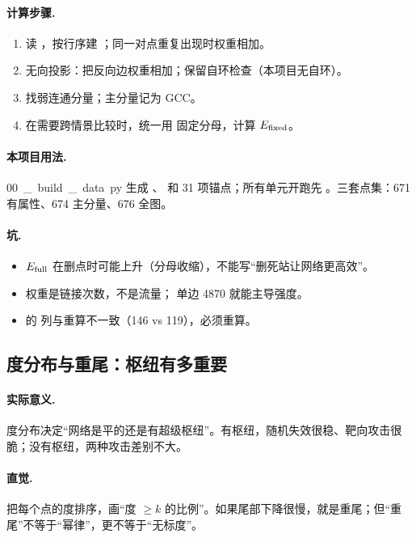 \paragraph{计算步骤.}
\begin{enumerate}
  \item 读 ，按行序建 ；同一对点重复出现时权重相加。
  \item 无向投影：把反向边权重相加；保留自环检查（本项目无自环）。
  \item 找弱连通分量；主分量记为 GCC。
  \item 在需要跨情景比较时，统一用  固定分母，计算 \(E_{\mathrm{fixed}}\)。
\end{enumerate}

\paragraph{本项目用法.}
\unit{00\_build\_data.py} 生成 、 和 31 项锚点；所有单元开跑先 。三套点集：671 有属性、674 主分量、676 全图。

\paragraph{坑.}
\begin{itemize}
  \item \(E_{\mathrm{full}}\) 在删点时可能上升（分母收缩），不能写“删死站让网络更高效”。
  \item 权重是链接次数，不是流量； 单边 4870 就能主导强度。
  \item {} 的  列与重算不一致（146 vs 119），必须重算。
\end{itemize}

\subsection{度分布与重尾：枢纽有多重要}

\paragraph{实际意义.}
度分布决定“网络是平的还是有超级枢纽”。有枢纽，随机失效很稳、靶向攻击很脆；没有枢纽，两种攻击差别不大。

\paragraph{直觉.}
把每个点的度排序，画“度 \(\ge k\) 的比例”。如果尾部下降很慢，就是重尾；但“重尾”不等于“幂律”，更不等于“无标度”。

